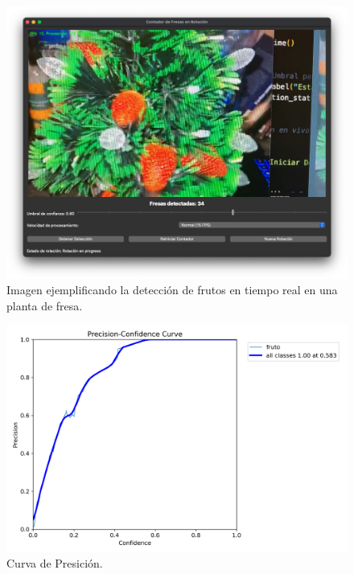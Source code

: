 \documentclass[conference]{IEEEtran}
\begin{document}
\begin{figure}[ht]
    \centering
    \includegraphics[width=\columnwidth]{images/real-dec2.png}
    \caption{Imagen ejemplificando la detección de frutos en tiempo real en una planta de fresa.}
    \label{fig:real-dec2}
\end{figure}

\begin{figure}[ht]
    \centering
    \includegraphics[width=\columnwidth]{images/P_curve.png}
    \caption{Curva de Presición.}
    \label{fig:P_curve}
\end{figure}
\end{document}
